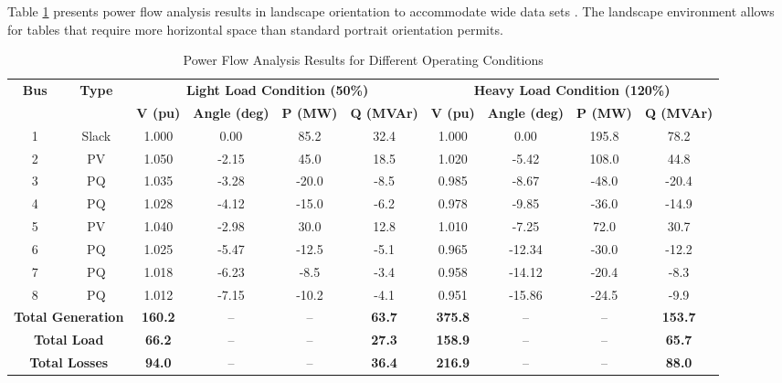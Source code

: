 Table \ref{tab:power_analysis} presents power flow analysis results in landscape orientation to accommodate wide data sets \cite{wood2013power}. The landscape environment allows for tables that require more horizontal space than standard portrait orientation permits.
\vspace{-3cm}
\begin{landscape}
	\begin{table}[htbp]
		\centering
		\caption{Power Flow Analysis Results for Different Operating Conditions}
		\label{tab:power_analysis}
		\begin{tabular}{|c|c|c|c|c|c|c|c|c|c|}
			\hline
			\multirow{2}{*}{\textbf{Bus}} & \multirow{2}{*}{\textbf{Type}} & \multicolumn{4}{c|}{\textbf{Light Load Condition (50\%)}} & \multicolumn{4}{c|}{\textbf{Heavy Load Condition (120\%)}} \\
			\cline{3-10}
			& & \textbf{V (pu)} & \textbf{Angle (deg)} & \textbf{P (MW)} & \textbf{Q (MVAr)} & \textbf{V (pu)} & \textbf{Angle (deg)} & \textbf{P (MW)} & \textbf{Q (MVAr)} \\
			\hline
			1 & Slack & 1.000 & 0.00 & 85.2 & 32.4 & 1.000 & 0.00 & 195.8 & 78.2 \\
			2 & PV & 1.050 & -2.15 & 45.0 & 18.5 & 1.020 & -5.42 & 108.0 & 44.8 \\
			3 & PQ & 1.035 & -3.28 & -20.0 & -8.5 & 0.985 & -8.67 & -48.0 & -20.4 \\
			4 & PQ & 1.028 & -4.12 & -15.0 & -6.2 & 0.978 & -9.85 & -36.0 & -14.9 \\
			5 & PV & 1.040 & -2.98 & 30.0 & 12.8 & 1.010 & -7.25 & 72.0 & 30.7 \\
			6 & PQ & 1.025 & -5.47 & -12.5 & -5.1 & 0.965 & -12.34 & -30.0 & -12.2 \\
			7 & PQ & 1.018 & -6.23 & -8.5 & -3.4 & 0.958 & -14.12 & -20.4 & -8.3 \\
			8 & PQ & 1.012 & -7.15 & -10.2 & -4.1 & 0.951 & -15.86 & -24.5 & -9.9 \\
			\hline
			\multicolumn{2}{|c|}{\textbf{Total Generation}} & \textbf{160.2} & -- & -- & \textbf{63.7} & \textbf{375.8} & -- & -- & \textbf{153.7} \\
			\multicolumn{2}{|c|}{\textbf{Total Load}} & \textbf{66.2} & -- & -- & \textbf{27.3} & \textbf{158.9} & -- & -- & \textbf{65.7} \\
			\multicolumn{2}{|c|}{\textbf{Total Losses}} & \textbf{94.0} & -- & -- & \textbf{36.4} & \textbf{216.9} & -- & -- & \textbf{88.0} \\
			\hline
		\end{tabular}
	\end{table}
\end{landscape}

